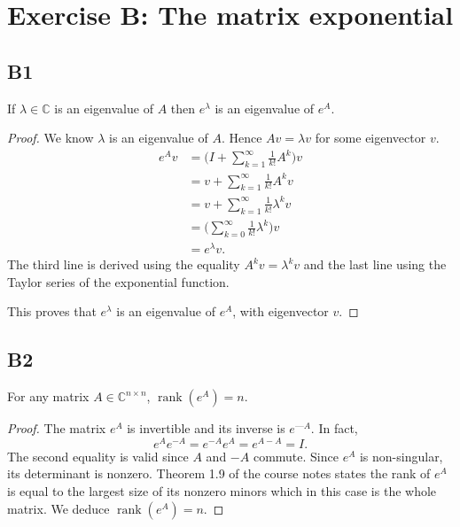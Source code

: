 \documentclass[11pt]{article}
\DeclareMathOperator{\rank}{rank}
\newcommand{\complex}{\mathbb{C}} %
\begin{document}
\section{Exercise B: The matrix exponential}
\subsection*{B1}
If $\lambda\in \complex$ is an eigenvalue of \(A\) then $e^\lambda$ is an eigenvalue of $e^A$.
\begin{proof}
We know $\lambda$ is an eigenvalue of \(A\).
Hence $Av=\lambda v$ for some eigenvector $v$.
\begin{align*}
    e^Av&=\Bigg(I+\sum^{\infty}_{k=1}\frac{1}{k!}A^k\Bigg)v\\
    &=v+\sum^{\infty}_{k=1}\frac{1}{k!}A^kv\\
    &=v+\sum^{\infty}_{k=1}\frac{1}{k!}\lambda^kv\\
    &=\Bigg(\sum^{\infty}_{k=0}\frac{1}{k!}\lambda^k\Bigg)v\\
    &=e^\lambda v.
\end{align*}
The third line is derived using the equality $A^kv=\lambda^kv$ and the last line using the Taylor series of the exponential function.

This proves that $e^\lambda$ is an eigenvalue of $e^A$, with eigenvector \(v\).
\end{proof}

\subsection*{B2}
For any matrix $A\in \complex^{n\times n}$, $\rank(e^A)=n$.

\begin{proof}
The matrix $e^A$ is invertible and its inverse is $e^{—A}$.
In fact,
\[
    e^{A}e^{-A}=e^{-A}e^{A}=e^{A-A}=I.
\]
The second equality is valid since \(A\) and \(-A\) commute. Since $e^{A}$ is non-singular, its determinant is nonzero. Theorem 1.9 of the course notes states the rank of $e^A$ is equal to the largest size of its nonzero minors which in this case is the whole matrix. We deduce $\rank(e^A)=n$. 
\end{proof}
\end{document}
